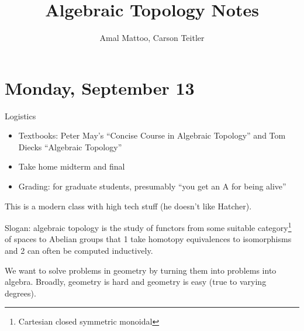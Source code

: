 \documentclass[12pt]{article}
\title{Algebraic Topology Notes}
\author{Amal Mattoo, Carson Teitler}
\theoremstyle{definition}
\begin{document}
	\maketitle 
	\section{Monday, September 13}
	Logistics 
	\begin{itemize}
		\item Textbooks: Peter May's ``Concise Course in Algebraic Topology'' and Tom Diecks ``Algebraic Topology''
		\item Take home midterm and final
		\item Grading: for graduate students, presumably ``you get an A for being alive'' 
	\end{itemize}
	This is a modern class with high tech stuff (he doesn't like Hatcher). 
	
	Slogan: algebraic topology is the study of functors from some suitable category\footnote{Cartesian closed symmetric monoidal} of spaces to Abelian groups that 1 take homotopy equivalences to isomorphisms and 2 can often be computed inductively. 
	
	We want to solve problems in geometry by turning them into problems into algebra. Broadly, geometry is hard and geometry is easy (true to varying degrees).
	
\end{document}
